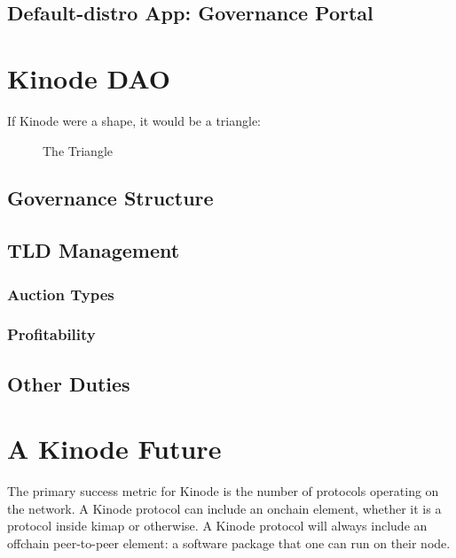 \documentclass[runningheads]{llncs}
\begin{document}
\subsection{Default-distro App: Governance Portal}


%
%
%
\section{Kinode DAO}

If Kinode were a shape, it would be a triangle:

\begin{figure}
    \centering
    \caption{The Triangle}
    \label{fig:triangle}
\end{figure}

\subsection{Governance Structure}
\subsection{TLD Management}
\subsubsection{Auction Types}
\subsubsection{Profitability}
\subsection{Other Duties}
%
%
%
\section{A Kinode Future}

The primary success metric for Kinode is the number of protocols operating on the network.
A Kinode protocol can include an onchain element, whether it is a protocol inside kimap or otherwise.
A Kinode protocol will always include an offchain peer-to-peer element: a software package that one can run on their node.
\end{document}
